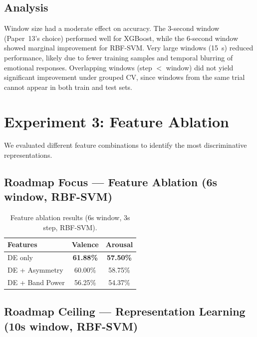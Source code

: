 \documentclass[12pt,a4paper]{report}
\begin{document}
\subsection{Analysis}

Window size had a moderate effect on accuracy. The 3-second window (Paper~13's
choice) performed well for XGBoost, while the 6-second window showed marginal
improvement for RBF-SVM. Very large windows (15~s) reduced performance, likely
due to fewer training samples and temporal blurring of emotional responses.
Overlapping windows (step $<$ window) did not yield significant improvement
under grouped CV, since windows from the same trial cannot appear in both
train and test sets.


\section{Experiment 3: Feature Ablation}
\label{sec:exp_features}

We evaluated different feature combinations to identify the most discriminative
representations.

\subsection{Roadmap Focus --- Feature Ablation (6s window, RBF-SVM)}

\begin{table}[H]
\centering
\caption{Feature ablation results (6s window, 3s step, RBF-SVM).}
\label{tab:feature_ablation}
\begin{tabular}{lcc}
\toprule
\textbf{Features} & \textbf{Valence} & \textbf{Arousal} \\
\midrule
DE only              & \textbf{61.88\%} & \textbf{57.50\%} \\
DE + Asymmetry       & 60.00\% & 58.75\% \\
DE + Band Power      & 56.25\% & 54.37\% \\
\bottomrule
\end{tabular}
\end{table}

\subsection{Roadmap Ceiling --- Representation Learning (10s window, RBF-SVM)}
\end{document}
